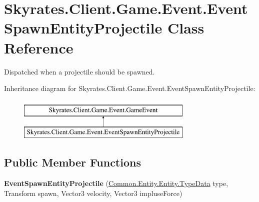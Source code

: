 \hypertarget{class_skyrates_1_1_client_1_1_game_1_1_event_1_1_event_spawn_entity_projectile}{\section{Skyrates.\-Client.\-Game.\-Event.\-Event\-Spawn\-Entity\-Projectile Class Reference}
\label{class_skyrates_1_1_client_1_1_game_1_1_event_1_1_event_spawn_entity_projectile}
}


Dispatched when a projectile should be spawned.  


Inheritance diagram for Skyrates.\-Client.\-Game.\-Event.\-Event\-Spawn\-Entity\-Projectile\-:\begin{figure}[H]
\begin{center}
\leavevmode
\includegraphics[height=2.000000cm]{class_skyrates_1_1_client_1_1_game_1_1_event_1_1_event_spawn_entity_projectile}
\end{center}
\end{figure}
\subsection*{Public Member Functions}
\begin{DoxyCompactItemize}
\item 
\hypertarget{class_skyrates_1_1_client_1_1_game_1_1_event_1_1_event_spawn_entity_projectile_a1bd9977802e5e0737c5a9af679b54d5a}{{\bfseries Event\-Spawn\-Entity\-Projectile} (\hyperlink{class_skyrates_1_1_common_1_1_entity_1_1_entity_1_1_type_data}{Common.\-Entity.\-Entity.\-Type\-Data} type, Transform spawn, Vector3 velocity, Vector3 impluse\-Force)}\label{class_skyrates_1_1_client_1_1_game_1_1_event_1_1_event_spawn_entity_projectile_a1bd9977802e5e0737c5a9af679b54d5a}

\end{DoxyCompactItemize}
